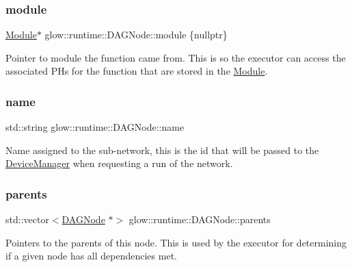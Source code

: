 \subsubsection{\texorpdfstring{module}{module}}
{\footnotesize\ttfamily \hyperlink{classglow_1_1_module}{Module}$\ast$ glow\+::runtime\+::\+D\+A\+G\+Node\+::module \{nullptr\}}

Pointer to module the function came from. This is so the executor can access the associated P\+Hs for the function that are stored in the \hyperlink{classglow_1_1_module}{Module}. \mbox{\label{structglow_1_1runtime_1_1_d_a_g_node_aab073cf1b6f7dfd082d2b9e25c9a9537}} 
\subsubsection{\texorpdfstring{name}{name}}
{\footnotesize\ttfamily std\+::string glow\+::runtime\+::\+D\+A\+G\+Node\+::name}

Name assigned to the sub-\/network, this is the id that will be passed to the \hyperlink{classglow_1_1runtime_1_1_device_manager}{Device\+Manager} when requesting a run of the network. \mbox{\label{structglow_1_1runtime_1_1_d_a_g_node_aa7caed7ac1821e8f5be54dbc252eb6ed}} 
\subsubsection{\texorpdfstring{parents}{parents}}
{\footnotesize\ttfamily std\+::vector$<$\hyperlink{structglow_1_1runtime_1_1_d_a_g_node}{D\+A\+G\+Node} $\ast$$>$ glow\+::runtime\+::\+D\+A\+G\+Node\+::parents}

Pointers to the parents of this node. This is used by the executor for determining if a given node has all dependencies met. \mbox{\label{structglow_1_1runtime_1_1_d_a_g_node_a39192dae64c44795d60b4cc36e8d7e1d}} 
